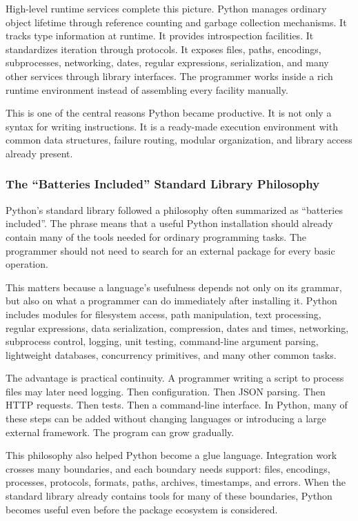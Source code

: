 High-level runtime services complete this picture. Python manages ordinary object lifetime through reference counting and garbage collection mechanisms. It tracks type information at runtime. It provides introspection facilities. It standardizes iteration through protocols. It exposes files, paths, encodings, subprocesses, networking, dates, regular expressions, serialization, and many other services through library interfaces. The programmer works inside a rich runtime environment instead of assembling every facility manually.

This is one of the central reasons Python became productive. It is not only a syntax for writing instructions. It is a ready-made execution environment with common data structures, failure routing, modular organization, and library access already present.

\subsubsection{The ``Batteries Included'' Standard Library Philosophy}

Python's standard library followed a philosophy often summarized as ``batteries included''. The phrase means that a useful Python installation should already contain many of the tools needed for ordinary programming tasks. The programmer should not need to search for an external package for every basic operation.

This matters because a language's usefulness depends not only on its grammar, but also on what a programmer can do immediately after installing it. Python includes modules for filesystem access, path manipulation, text processing, regular expressions, data serialization, compression, dates and times, networking, subprocess control, logging, unit testing, command-line argument parsing, lightweight databases, concurrency primitives, and many other common tasks.

The advantage is practical continuity. A programmer writing a script to process files may later need logging. Then configuration. Then JSON parsing. Then HTTP requests. Then tests. Then a command-line interface. In Python, many of these steps can be added without changing languages or introducing a large external framework. The program can grow gradually.

This philosophy also helped Python become a glue language. Integration work crosses many boundaries, and each boundary needs support: files, encodings, processes, protocols, formats, paths, archives, timestamps, and errors. When the standard library already contains tools for many of these boundaries, Python becomes useful even before the package ecosystem is considered.

